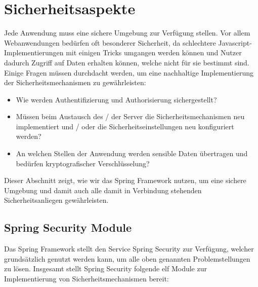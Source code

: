 \section{Sicherheitsaspekte}

Jede Anwendung muss eine sichere Umgebung zur Verfügung stellen. Vor allem 
Webanwendungen bedürfen oft besonderer Sicherheit, da schlechtere Javascript-
Implementierungen mit einigen Tricks umgangen werden können und Nutzer dadurch 
Zugriff auf Daten erhalten können, welche nicht für sie bestimmt sind. Einige 
Fragen müssen durchdacht werden, um eine nachhaltige Implementierung der 
Sicherheitsmechanismen zu gewährleisten:

\begin{itemize}
\item Wie werden Authentifizierung und Authorisierung sichergestellt?
\item Müssen beim Austausch des / der Server die Sicherheitsmechanismen neu implementiert und / oder die
	  Sicherheitseinstellungen neu konfiguriert werden?
\item An welchen Stellen der Anwendung werden sensible Daten übertragen und bedürfen kryptografischer 	      
      Verschlüsselung?
\end{itemize} 

Dieser Abschnitt zeigt, wie wir das Spring Framework nutzen, um eine sichere 
Umgebung und damit auch alle damit in Verbindung stehenden Sicherheitsanliegen 
gewährleisten.

\subsection{Spring Security Module}

Das Spring Framework stellt den Service Spring Security zur Verfügung, welcher grundsätzlich genutzt 
werden kann, um alle oben genannten Problemstellungen zu lösen. Insgesamt stellt Spring Security folgende 
elf Module zur Implementierung von Sicherheitsmechanismen bereit:

